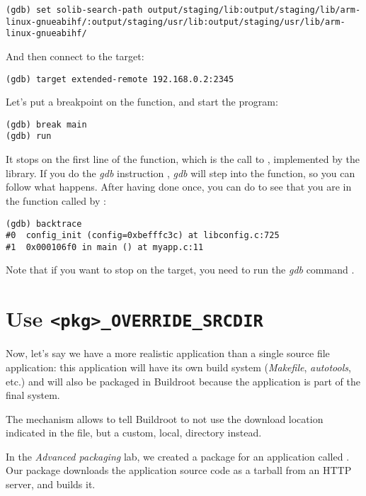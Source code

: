 \begin{verbatim}
(gdb) set solib-search-path output/staging/lib:output/staging/lib/arm-linux-gnueabihf/:output/staging/usr/lib:output/staging/usr/lib/arm-linux-gnueabihf/
\end{verbatim}

And then connect to the target:

\begin{verbatim}
(gdb) target extended-remote 192.168.0.2:2345
\end{verbatim}

Let's put a breakpoint on the  function, and start the
program:

\begin{verbatim}
(gdb) break main
(gdb) run
\end{verbatim}

It stops on the first line of the  function, which is the
call to , implemented by the 
library. If you do the {\em gdb} instruction , {\em gdb}
will step into the function, so you can follow what happens. After
having done  once, you can do  to see that
you are in the function  called by :

\begin{verbatim}
(gdb) backtrace
#0  config_init (config=0xbefffc3c) at libconfig.c:725
#1  0x000106f0 in main () at myapp.c:11
\end{verbatim}

Note that if you want  to stop on the target, you need
to run the {\em gdb} command .

\section{Use {\tt <pkg>\_OVERRIDE\_SRCDIR}}

Now, let's say we have a more realistic application than a single
source file application: this application will have its own build
system ({\em Makefile}, {\em autotools}, etc.) and will also be
packaged in Buildroot because the application is part of the final
system.

The  mechanism allows to tell Buildroot to
not use the download location indicated in the  file, but a
custom, local, directory instead.

In the {\em Advanced packaging} lab, we created a package for an
application called . Our  package downloads the
application source code as a tarball from an HTTP server, and builds
it.

